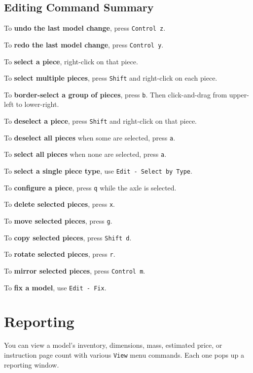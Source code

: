 \documentclass[12pt]{report}
\begin{document}
\subsection{Editing Command Summary}
\begin{list}{}{}
  \item To \textbf{undo the last model change}, press {\tt Control z}.
  \item To \textbf{redo the last model change}, press {\tt Control y}.
  \item To \textbf{select a piece}, right-click on that piece.
  \item To \textbf{select multiple pieces}, press {\tt Shift} and
    right-click on each piece.
  \item To \textbf{border-select a group of pieces}, press {\tt b}.
    Then click-and-drag from upper-left to lower-right.
  \item To \textbf{deselect a piece}, press {\tt Shift} and
    right-click on that piece.
  \item To \textbf{deselect all pieces} when some are selected, press
    {\tt a}.
  \item To \textbf{select all pieces} when none are selected, press
    {\tt a}.
  \item To \textbf{select a single piece type}, use {\tt Edit - Select by Type}.
  \item To \textbf{configure a piece}, press {\tt q} while the axle is selected.
  \item To \textbf{delete selected pieces}, press {\tt x}.
  \item To \textbf{move selected pieces}, press {\tt g}.
  \item To \textbf{copy selected pieces}, press {\tt Shift d}.
  \item To \textbf{rotate selected pieces}, press {\tt r}.
  \item To \textbf{mirror selected pieces}, press {\tt Control m}.
  \item To \textbf{fix a model}, use {\tt Edit - Fix}.
\end{list}

\section{Reporting}

You can view a model's inventory, dimensions, mass, estimated price,
or instruction page count with various {\tt View} menu commands.  Each
one pops up a reporting window.
\end{document}
